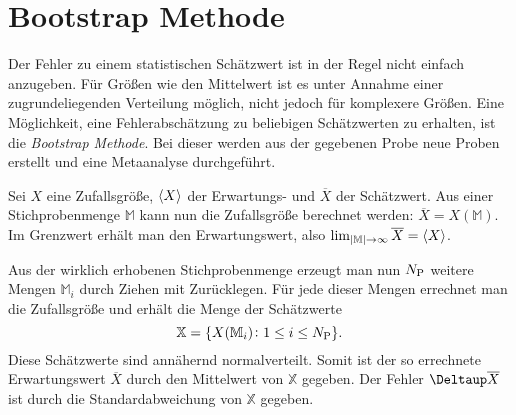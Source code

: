 \section{Bootstrap Methode}


Der Fehler zu einem statistischen Schätzwert ist in der Regel nicht einfach
anzugeben. Für Größen wie den Mittelwert ist es unter Annahme einer
zugrundeliegenden Verteilung möglich, nicht jedoch für komplexere Größen. Eine
Möglichkeit, eine Fehlerabschätzung zu beliebigen Schätzwerten zu erhalten, ist
die \emph{Bootstrap Methode}. Bei dieser werden aus der gegebenen Probe neue
Proben erstellt und eine Metaanalyse durchgeführt.

Sei $X$ eine Zufallsgröße, $\langle X \rangle$ der Erwartungs- und $\overline X$ der
Schätzwert. Aus einer Stichprobenmenge $\mathbb M$ kann nun die Zufallsgröße
berechnet werden: $\overline X = X(\mathbb M)$. Im Grenzwert erhält man den
Erwartungswert, also $\lim_{|\mathbb M| \to \infty} \overline X = \langle X \rangle$.

Aus der wirklich erhobenen Stichprobenmenge erzeugt man nun $N_\text P$ weitere
Mengen $\mathbb M_i$ durch Ziehen mit Zurücklegen. Für jede dieser Mengen
errechnet man die Zufallsgröße und erhält die Menge der Schätzwerte
\[
    \mathbb X = \{ X(\mathbb M_i) \colon 1 \leq i \leq N_\text P \}.
\]
Diese Schätzwerte sind annähernd normalverteilt. Somit ist der so errechnete
Erwartungswert $\overline X$ durch den Mittelwert von $\mathbb X$ gegeben. Der
Fehler $\Deltaup \overline X$ ist durch die Standardabweichung von $\mathbb X$
gegeben.





